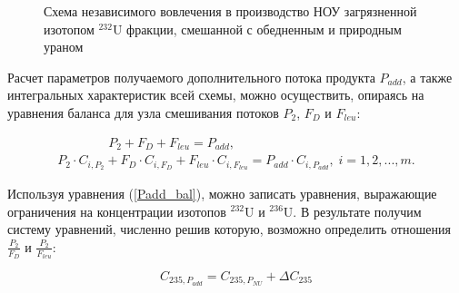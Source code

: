 \begin{figure}[ht]
    \caption{Схема независимого вовлечения в производство НОУ загрязненной изотопом $^{232}$U фракции, смешанной с обедненным и природным ураном}\label{P2utilization}
\end{figure}

Расчет параметров получаемого дополнительного потока продукта $P_{add}$, а также интегральных характеристик всей схемы, можно осуществить, опираясь на уравнения баланса для узла смешивания потоков $P_2$, $F_D$ и $F_{leu}$:

\begin{equation} \label{Padd_bal} 
  \begin{array}{l} {\quad \quad \quad \quad {P_{2}+F_D+F_{leu}=P_{add}},} \\
    {P_{2} \cdot C_{i,P_{2}} + F_D \cdot C_{i,F_D} + F_{leu} \cdot C_{i,F_{leu}}  = P_{add} \cdot C_{i,P_{add}} ,\; i=1,2,...,m.} \end{array} 
\end{equation}

Используя уравнения (\ref{Padd_bal}), можно записать уравнения, выражающие ограничения на концентрации изотопов $^{232}$U и $^{236}$U.
В результате получим систему уравнений, численно решив которую, возможно определить отношения $\frac{P_2}{F_D}$ и $\frac{P_2}{F_{leu}}$:

\begin{equation}\label{dis_235_6_Padd}
    C_{235,P_{add}} = C_{235,P_{NU}} + \Delta C_{235}
\end{equation}

